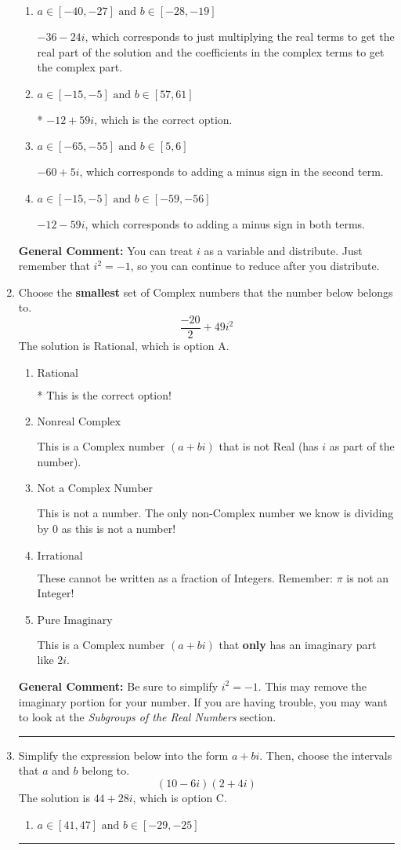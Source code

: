 \documentclass{extbook}[14pt]
\newcommand{\litem}[1]{\item #1

\rule{\textwidth}{0.4pt}}
\begin{document}
\begin{enumerate}
{\begin{enumerate}[label=\Alph*.]
 $-60 - 5 i$, which corresponds to adding a minus sign in the first term.
\item \( a \in [-40, -27] \text{ and } b \in [-28, -19] \)

 $-36 - 24 i$, which corresponds to just multiplying the real terms to get the real part of the solution and the coefficients in the complex terms to get the complex part.
\item \( a \in [-15, -5] \text{ and } b \in [57, 61] \)

* $-12 + 59 i$, which is the correct option.
\item \( a \in [-65, -55] \text{ and } b \in [5, 6] \)

 $-60 + 5 i$, which corresponds to adding a minus sign in the second term.
\item \( a \in [-15, -5] \text{ and } b \in [-59, -56] \)

 $-12 - 59 i$, which corresponds to adding a minus sign in both terms.
\end{enumerate}

\textbf{General Comment:} You can treat $i$ as a variable and distribute. Just remember that $i^2=-1$, so you can continue to reduce after you distribute.
}
\litem{
Choose the \textbf{smallest} set of Complex numbers that the number below belongs to.
\[ \frac{-20}{2}+49i^2 \]The solution is \( \text{Rational} \), which is option A.\begin{enumerate}[label=\Alph*.]
\item \( \text{Rational} \)

* This is the correct option!
\item \( \text{Nonreal Complex} \)

This is a Complex number $(a+bi)$ that is not Real (has $i$ as part of the number).
\item \( \text{Not a Complex Number} \)

This is not a number. The only non-Complex number we know is dividing by 0 as this is not a number!
\item \( \text{Irrational} \)

These cannot be written as a fraction of Integers. Remember: $\pi$ is not an Integer!
\item \( \text{Pure Imaginary} \)

This is a Complex number $(a+bi)$ that \textbf{only} has an imaginary part like $2i$.
\end{enumerate}

\textbf{General Comment:} Be sure to simplify $i^2 = -1$. This may remove the imaginary portion for your number. If you are having trouble, you may want to look at the \textit{Subgroups of the Real Numbers} section.
}
\litem{
Simplify the expression below into the form $a+bi$. Then, choose the intervals that $a$ and $b$ belong to.
\[ (10 - 6 i)(2 + 4 i) \]The solution is \( 44 + 28 i \), which is option C.\begin{enumerate}[label=\Alph*.]
\item \( a \in [41, 47] \text{ and } b \in [-29, -25] \)


\end{enumerate}}
\end{enumerate}
\end{document}
